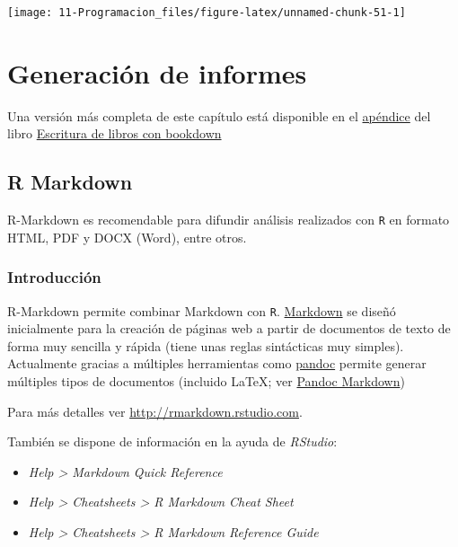 \documentclass[]{book}
\begin{document}
\begin{center}\texttt{[image: 11-Programacion\_files/figure-latex/unnamed-chunk-51-1]} \end{center}

\chapter{Generación de informes}\label{generacion-de-informes}

Una versión más completa de este capítulo está disponible en el
\href{https://rubenfcasal.github.io/bookdown_intro/rmarkdown.html}{apéndice}
del libro \href{https://rubenfcasal.github.io/bookdown_intro}{Escritura
de libros con bookdown}

\section{R Markdown}\label{r-markdown}

R-Markdown es recomendable para difundir análisis realizados con
\texttt{R} en formato HTML, PDF y DOCX (Word), entre otros.

\subsection{Introducción}\label{introduccion-1}

R-Markdown permite combinar Markdown con \texttt{R}.
\href{http://daringfireball.net/projects/markdown/}{Markdown} se diseñó
inicialmente para la creación de páginas web a partir de documentos de
texto de forma muy sencilla y rápida (tiene unas reglas sintácticas muy
simples). Actualmente gracias a múltiples herramientas como
\href{http://pandoc.org/}{pandoc} permite generar múltiples tipos de
documentos (incluido LaTeX; ver
\href{http://rmarkdown.rstudio.com/authoring_pandoc_markdown.html}{Pandoc
Markdown})

Para más detalles ver \url{http://rmarkdown.rstudio.com}.

También se dispone de información en la ayuda de \emph{RStudio}:

\begin{itemize}
\item
  \emph{Help \textgreater{} Markdown Quick Reference}
\item
  \emph{Help \textgreater{} Cheatsheets \textgreater{} R Markdown Cheat
  Sheet}
\item
  \emph{Help \textgreater{} Cheatsheets \textgreater{} R Markdown
  Reference Guide}
\end{itemize}
\end{document}
